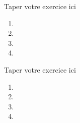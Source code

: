 \documentclass[a4paper,12pt]{report}
\begin{document}
\begin{myexo}
	Taper votre exercice ici
	\begin{enumerate}
		\item 
		
		\item 
		\item 
		\item
		
	\end{enumerate}
	
\end{myexo}
\begin{myexo}
	Taper votre exercice ici
	\begin{enumerate}
		\item 
		
		\item 
		\item 
		\item
		
	\end{enumerate}
	
\end{myexo}
\end{document}
